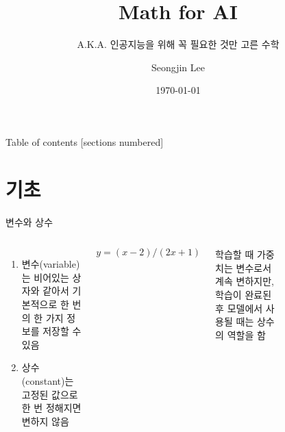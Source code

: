\documentclass[10pt,t]{beamer}
\title{Math for AI}
\subtitle{A.K.A. 인공지능을 위해 꼭 필요한 것만 고른 수학}
\date{\today}
\author{Seongjin Lee}
\institute{Gyeongsang National University}
\begin{document}
\maketitle

\begin{frame}{Table of contents}
  [sections numbered]
  \tableofcontents[hideallsubsections]
\end{frame}

\section{기초}

\begin{frame}[fragile]{변수와 상수}
    \begin{columns}[T,onlytextwidth]
        \begin{enumerate}
            \item 변수(variable)는 비어있는 상자와 같아서 기본적으로 한 번의 한 가지 정보를 저장할 수 있음
            \item 상수(constant)는 고정된 값으로 한 번 정해지면 변하지 않음
        \end{enumerate}

        \begin{equation*}
        y=(x-2)/(2x+1)
        \end{equation*}    
        
        학습할 때 가중치는 변수로서 계속 변하지만, 학습이 완료된 후 모델에서 사용될 때는 상수의 역할을 함

        \begin{figure}
        \end{figure}
    \end{columns}

\end{frame}
\end{document}
